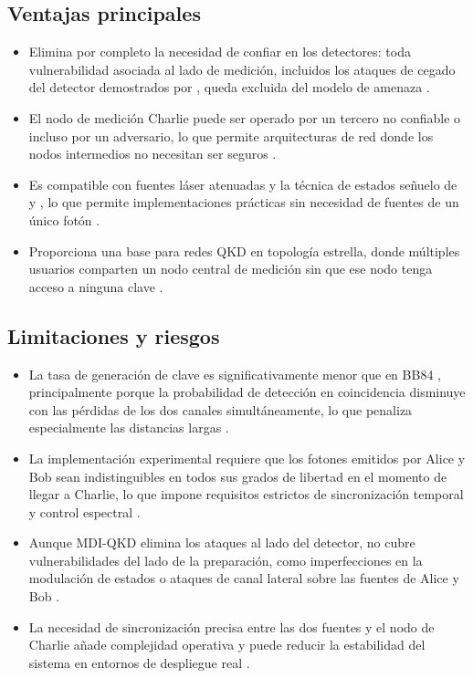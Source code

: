 \subsection{Ventajas principales}
\begin{itemize}
    \item Elimina por completo la necesidad de confiar en los detectores: toda vulnerabilidad asociada al lado de medición, incluidos los ataques de cegado del detector demostrados por \cite{lydersen2010}, queda excluida del modelo de amenaza \citep{lo2012}.
    \item El nodo de medición Charlie puede ser operado por un tercero no confiable o incluso por un adversario, lo que permite arquitecturas de red donde los nodos intermedios no necesitan ser seguros \citep{lo2012,braunstein2012}.
    \item Es compatible con fuentes láser atenuadas y la técnica de estados señuelo de \cite{lo2005} y \cite{wang2005}, lo que permite implementaciones prácticas sin necesidad de fuentes de un único fotón \citep{lo2012,curty2014}.
    \item Proporciona una base para redes QKD en topología estrella, donde múltiples usuarios comparten un nodo central de medición sin que ese nodo tenga acceso a ninguna clave \citep{curty2014,lo2014}.
\end{itemize}
 
\subsection{Limitaciones y riesgos}
\begin{itemize}
    \item La tasa de generación de clave es significativamente menor que en BB84 \citep{bennett1984}, principalmente porque la probabilidad de detección en coincidencia disminuye con las pérdidas de los dos canales simultáneamente, lo que penaliza especialmente las distancias largas \citep{lo2012,curty2014}.
    \item La implementación experimental requiere que los fotones emitidos por Alice y Bob sean indistinguibles en todos sus grados de libertad en el momento de llegar a Charlie, lo que impone requisitos estrictos de sincronización temporal y control espectral \citep{lo2012,gisin2002}.
    \item Aunque MDI-QKD elimina los ataques al lado del detector, no cubre vulnerabilidades del lado de la preparación, como imperfecciones en la modulación de estados o ataques de canal lateral sobre las fuentes de Alice y Bob \citep{scarani2009,curty2014}.
    \item La necesidad de sincronización precisa entre las dos fuentes y el nodo de Charlie añade complejidad operativa y puede reducir la estabilidad del sistema en entornos de despliegue real \citep{lo2012,lo2014}.
\end{itemize}
 
